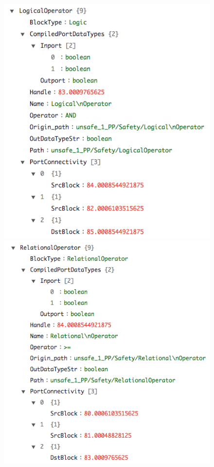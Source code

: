 \documentclass{article}
\begin{document}
\begin{figure}[h]
\begin{center}
    \includegraphics[scale=0.4]{figures/safety3}
    \includegraphics[scale=0.4]{figures/safety5}      

\end{center}
\end{figure}
\end{document}
